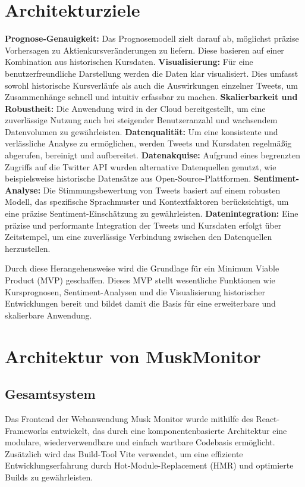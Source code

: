 \documentclass[conference,a4paper,flushend]{cs-techrep}
\begin{document}
\section{Architekturziele} %
\textbf{Prognose-Genauigkeit:}  Das Prognosemodell zielt darauf ab, möglichst präzise Vorhersagen zu Aktienkursveränderungen zu liefern. Diese basieren auf einer Kombination aus historischen Kursdaten.
\textbf{Visualisierung:} Für eine benutzerfreundliche Darstellung werden die Daten klar visualisiert. Dies umfasst sowohl historische Kursverläufe als auch die Auswirkungen einzelner Tweets, um Zusammenhänge schnell und intuitiv erfassbar zu machen.
\textbf{Skalierbarkeit und Robustheit:} Die Anwendung wird in der Cloud bereitgestellt, um eine zuverlässige Nutzung auch bei steigender Benutzeranzahl und wachsendem Datenvolumen zu gewährleisten.
\textbf{Datenqualität:} Um eine konsistente und verlässliche Analyse zu ermöglichen, werden Tweets und Kursdaten regelmäßig abgerufen, bereinigt und aufbereitet.
\textbf{Datenakquise:} Aufgrund eines begrenzten Zugriffs auf die Twitter API wurden alternative Datenquellen genutzt, wie beispielsweise historische Datensätze aus Open-Source-Plattformen.
\textbf{Sentiment-Analyse:} Die Stimmungsbewertung von Tweets basiert auf einem robusten Modell, das spezifische Sprachmuster und Kontextfaktoren berücksichtigt, um eine präzise Sentiment-Einschätzung zu gewährleisten.
\textbf{Datenintegration:} Eine präzise und performante Integration der Tweets und Kursdaten erfolgt über Zeitstempel, um eine zuverlässige Verbindung zwischen den Datenquellen herzustellen.

Durch diese Herangehensweise wird die Grundlage für ein Minimum Viable Product (MVP) geschaffen. Dieses MVP stellt wesentliche Funktionen wie Kursprognosen, Sentiment-Analysen und die Visualisierung historischer Entwicklungen bereit und bildet damit die Basis für eine erweiterbare und skalierbare Anwendung.

\section{Architektur von MuskMonitor}

\subsection{Gesamtsystem}
Das Frontend der Webanwendung Musk Monitor wurde mithilfe des React-Frameworks entwickelt, das durch eine komponentenbasierte Architektur eine modulare, wiederverwendbare und einfach wartbare Codebasis ermöglicht. Zusätzlich wird das Build-Tool Vite verwendet, um eine effiziente Entwicklungserfahrung durch Hot-Module-Replacement (HMR) und optimierte Builds zu gewährleisten.
\end{document}
